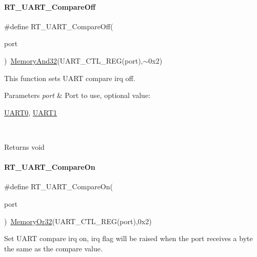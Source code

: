 \paragraph{\texorpdfstring{R\+T\+\_\+\+U\+A\+R\+T\+\_\+\+Compare\+Off}{RT\_UART\_CompareOff}}
{\footnotesize\ttfamily \#define R\+T\+\_\+\+U\+A\+R\+T\+\_\+\+Compare\+Off(\begin{DoxyParamCaption}\item[{}]{port }\end{DoxyParamCaption})~\mbox{\hyperlink{a00068_ad87cedffcaadc51db22594fce55173d4}{Memory\+And32}}(U\+A\+R\+T\+\_\+\+C\+T\+L\+\_\+\+R\+EG(port),$\sim$0x2)}



This function sets U\+A\+RT compare irq off. 


\begin{DoxyParams}{Parameters}
{\em port} & Port to use, optional value\+:
\begin{DoxyCode}
\mbox{\hyperlink{a00173_a0508661f121639ffdee7de2353a0def2}{UART0}}, \mbox{\hyperlink{a00173_a8d69bf04d07af4fbbab5a8bd291f65ff}{UART1}}
\end{DoxyCode}
 \\
\hline
\end{DoxyParams}
\begin{DoxyReturn}{Returns}
void 
\end{DoxyReturn}
\mbox{\label{a00173_aab5e3da11e9f9d531cab23aa451d2356}} 
\paragraph{\texorpdfstring{R\+T\+\_\+\+U\+A\+R\+T\+\_\+\+Compare\+On}{RT\_UART\_CompareOn}}
{\footnotesize\ttfamily \#define R\+T\+\_\+\+U\+A\+R\+T\+\_\+\+Compare\+On(\begin{DoxyParamCaption}\item[{}]{port }\end{DoxyParamCaption})~\mbox{\hyperlink{a00068_a27874a97deab7cecdde5ddecf466e31e}{Memory\+Or32}}(U\+A\+R\+T\+\_\+\+C\+T\+L\+\_\+\+R\+EG(port),0x2)}



Set U\+A\+RT compare irq on, irq flag will be raised when the port receives a byte the same as the compare value. 


